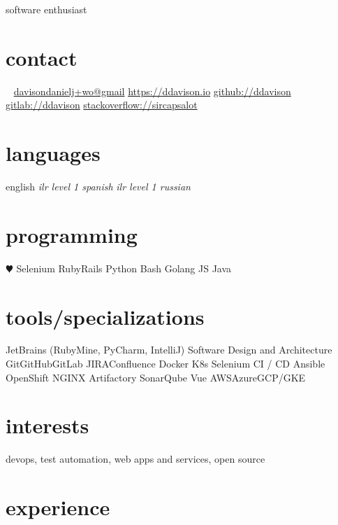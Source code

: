 \documentclass[]{ddavison-resume}
\begin{document}
       {software enthusiast}

\begin{aside}
  \section{contact}
    ~
    \href{mailto:davisondanielj+wo@gmail}{davisondanielj+wo@gmail}
    \href{https://ddavison.io}{https://ddavison.io}
    \href{https://github.com/ddavison}{github://ddavison}
    \href{https://gitlab.com/ddavison}{gitlab://ddavison}
    \href{https://stackoverflow.com/users/1695163/sircapsalot}{stackoverflow://sircapsalot}
  \section{languages}
    english
	\emph{ilr level 1 spanish}
	\emph{ilr level 1 russian}
  \section{programming}
    {\color{red} $\varheartsuit$} Selenium
	Ruby\bullet Rails
	Python
	Bash
	Golang
	JS
	Java
  \section{tools/specializations}
	JetBrains (RubyMine, PyCharm, IntelliJ)
	Software Design and Architecture
	Git\bullet GitHub\bullet GitLab	
  	JIRA\bullet Confluence
  	Docker
  	K8s
  	Selenium
  	CI / CD
  	Ansible
  	OpenShift
  	NGINX
  	Artifactory
  	SonarQube
  	Vue
    AWS\bullet Azure\bullet GCP/GKE
\end{aside}

\section{interests}

devops, test automation, web apps and services, open source

\section{experience}
\end{document}
